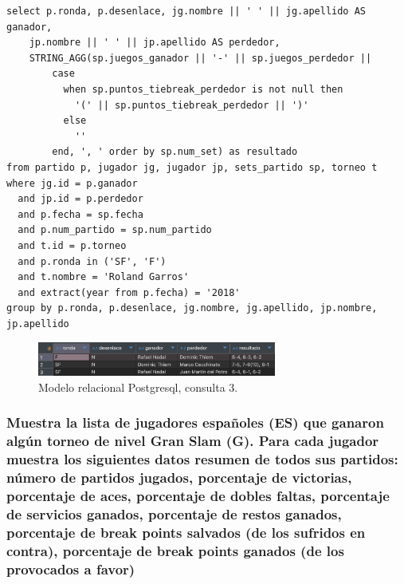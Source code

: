 \begin{verbatim}
select p.ronda, p.desenlace, jg.nombre || ' ' || jg.apellido AS ganador, 
	jp.nombre || ' ' || jp.apellido AS perdedor, 
	STRING_AGG(sp.juegos_ganador || '-' || sp.juegos_perdedor ||
		case
		  when sp.puntos_tiebreak_perdedor is not null then 
		  	'(' || sp.puntos_tiebreak_perdedor || ')'
		  else 
		  	'' 
		end, ', ' order by sp.num_set) as resultado
from partido p, jugador jg, jugador jp, sets_partido sp, torneo t
where jg.id = p.ganador
  and jp.id = p.perdedor
  and p.fecha = sp.fecha
  and p.num_partido = sp.num_partido
  and t.id = p.torneo
  and p.ronda in ('SF', 'F')
  and t.nombre = 'Roland Garros'
  and extract(year from p.fecha) = '2018'
group by p.ronda, p.desenlace, jg.nombre, jg.apellido, jp.nombre, jp.apellido
\end{verbatim}

\begin{figure}[H]
\centering
\includegraphics[width=0.7\textwidth]{fotos/q3_rel.png}
\caption{Modelo relacional Postgresql, consulta 3.}
\label{fig:q3_rel}
\end{figure}

\subsubsection{Muestra la lista de jugadores españoles (ES) que ganaron algún torneo de nivel Gran Slam (G). Para cada jugador muestra los siguientes datos resumen de todos sus partidos: número de partidos jugados, porcentaje de victorias, porcentaje de aces, porcentaje de dobles faltas, porcentaje de servicios ganados, porcentaje de restos ganados, porcentaje de break points salvados (de los sufridos en contra), porcentaje de break points ganados (de los provocados a favor)}


